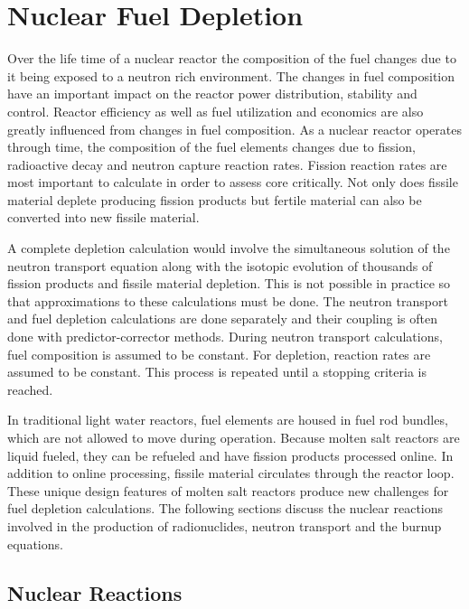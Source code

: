 \chapter{Nuclear Fuel Depletion} \label{ch:burnupEquations}
Over the life time of a nuclear reactor the composition of the fuel changes due to it being exposed to a neutron rich environment. The changes in fuel composition have an important impact on the reactor power distribution, stability and control. Reactor efficiency as well as fuel utilization and economics are also greatly influenced from changes in fuel composition. As a nuclear reactor operates through time, the composition of the fuel elements changes due to fission, radioactive decay and neutron capture reaction rates. Fission reaction rates are most important to calculate in order to assess core critically. Not only does fissile material deplete producing fission products but fertile material can also be converted into new fissile material.

A complete depletion calculation would involve the simultaneous solution of the neutron transport equation along with the isotopic evolution of thousands of fission products and fissile material depletion. This is not possible in practice so that approximations to these calculations must be done. The neutron transport and fuel depletion calculations are done separately and their coupling is often done with predictor-corrector methods. During neutron transport calculations, fuel composition is assumed to be constant. For depletion, reaction rates are assumed to be constant. This process is repeated until a stopping criteria is reached. 

In traditional light water reactors, fuel elements are housed in fuel rod bundles, which are not allowed to move during operation. Because molten salt reactors are liquid fueled, they can be refueled and have fission products processed online. In addition to online processing, fissile material circulates through the reactor loop. These unique design features of molten salt reactors produce new challenges for fuel depletion calculations. The following sections discuss the nuclear reactions involved in the production of radionuclides, neutron transport and the burnup equations.

\section{Nuclear Reactions}

